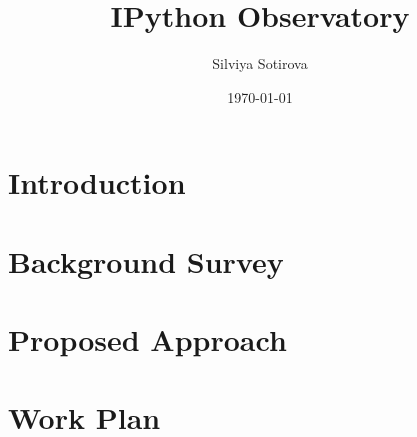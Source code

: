 \documentclass{mprop}
\begin{document}
\title{IPython Observatory}
\author{Silviya Sotirova}
\date{\today}
\maketitle

\tableofcontents
\newpage

\section{Introduction}
\label{intro}


\section{Background Survey}


\section{Proposed Approach}



\section{Work Plan}




\end{document}
